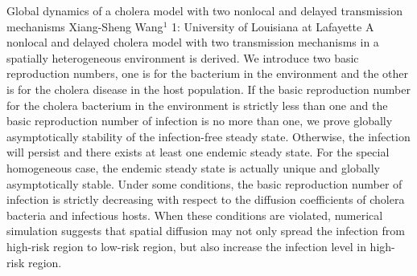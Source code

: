 \vspace{1.5ex}
\abs
{Global dynamics of a cholera model with two nonlocal and delayed transmission mechanisms}
{Xiang-Sheng Wang$^{1}$}
{1: University of Louisiana at Lafayette}
{A nonlocal and delayed cholera model with two transmission mechanisms in a spatially heterogeneous environment is derived. We introduce two basic reproduction numbers, one is for the bacterium in the environment and the other is for the cholera disease in the host population. If the basic reproduction number for the cholera bacterium in the environment is strictly less than one and the basic reproduction number of infection is no more than one, we prove globally asymptotically stability of the infection-free steady state. Otherwise, the infection will persist and there exists at least one endemic steady state. For the special homogeneous case, the endemic steady state is actually unique and globally asymptotically stable. Under some conditions, the basic reproduction number of infection is strictly decreasing with respect to the diffusion coefficients of cholera bacteria and infectious hosts. When these conditions are violated, numerical simulation suggests that spatial diffusion may not only spread the infection from high-risk region to low-risk region, but also increase the infection level in high-risk region.}
